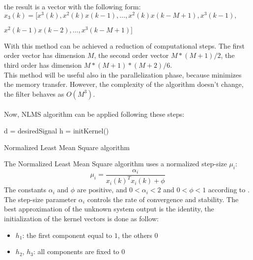 the result is a vector with the following form:\\
$x_3(k) = [ x^3(k), x^2(k)x(k-1),..., x^2(k)x(k-M+1), x^3(k-1),$
\begin{flushright}
$ x^2(k-1)x(k-2),..., x^3(k-M+1)]$
\end{flushright}
With this method can be achieved a reduction of computational steps. The first order vector has dimension $M$, the second order vector $M*(M+1)/2$, the third order has dimension $M*(M+1)*(M+2)/6$.\\ 
This method will be useful also in the parallelization phase, because minimizes the memory transfer. However, the complexity of the algorithm doesn't change, the filter behaves as $O(M^3)$.\\\\
Now, NLMS algorithm can be applied following these steps:\\
\begin{algorithm}[H]
\SetAlgoLined
d = desiredSignal\;
h = initKernel()\;
\caption{Normalized Least Mean Square algorithm}\label{alg:nlms}
\end{algorithm}
The Normalized Least Mean Square algorithm uses a normalized step-size $\mu_i$:
\[\mu_i = \frac{\alpha_i}{x_i(k)^T x_i(k) + \phi}\]
The constants $\alpha_i$ and $\phi$ are positive, and  $0<\alpha_i < 2$ and  $0<\phi < 1$ according to \cite{lmsestimation}.\\
The step-size parameter $\alpha_i$ controls the rate of convergence and stability.
The best approximation of the unknown system output is the identity, the initialization of the kernel vectors is done as follow:
\begin{itemize}
\item $h_1$: the first component equal to $1$, the others $0$
\item $h_2$, $h_3$: all components are fixed to $0$
\end{itemize}
